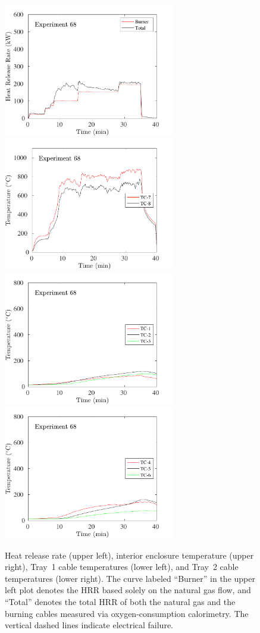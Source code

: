 \begin{figure}[H]
\includegraphics[height=2.30in]{../SCRIPT_FIGURES/Test_68_HRR} \hfill
\includegraphics[height=2.30in]{../SCRIPT_FIGURES/Test_68_TC_7-8} \\
\includegraphics[height=2.30in]{../SCRIPT_FIGURES/Test_68_TC_1-3} \hfill
\includegraphics[height=2.30in]{../SCRIPT_FIGURES/Test_68_TC_4-6}
\caption[HRR and temperatures of Exp.~68]{Heat release rate (upper left), interior enclosure temperature (upper right), Tray~1 cable temperatures (lower left), and Tray~2 cable temperatures (lower right). The curve labeled ``Burner'' in the upper left plot denotes the HRR based solely on the natural gas flow, and ``Total'' denotes the total HRR of both the natural gas and the burning cables measured via oxygen-consumption calorimetry. The vertical dashed lines indicate electrical failure.}
\label{fig:Test_68}
\end{figure}


